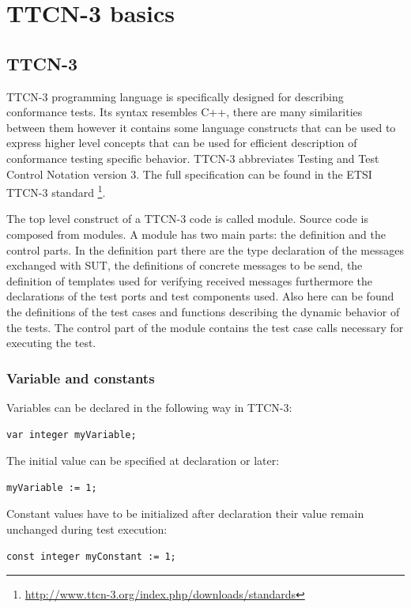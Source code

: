 \documentclass[a4paper]{article}
\begin{document}
\section{TTCN-3 basics}
\subsection{TTCN-3}
TTCN-3 programming language is specifically designed for describing conformance tests. Its syntax resembles C++, there
are many similarities between them however it contains some language constructs that can be used to express higher
level concepts that can be used for efficient description of conformance testing specific behavior. TTCN-3
abbreviates Testing and Test Control Notation version 3. The full specification can be found in the ETSI TTCN-3
standard \cite{ttcn3}
\footnote{\url{http://www.ttcn-3.org/index.php/downloads/standards}}.

The top level construct of a TTCN-3 code is called module. Source code is composed from modules. A module has two main
parts: the definition and the control parts. In the definition part there are the type declaration of the messages
exchanged
with SUT, the definitions of concrete messages to be send, the definition of templates used for verifying received
messages furthermore the declarations of the test ports and test components used. Also here can be found the
definitions of the test cases and functions describing the dynamic behavior of the tests. The control part of the
module contains the test case calls necessary for executing the test.

\subsubsection{Variable and constants}

Variables can be declared in the following way in TTCN-3:

{\footnotesize
\begin{lstlisting}
var integer myVariable;
\end{lstlisting}
}

The initial value can be specified at declaration or later:
{\footnotesize
\begin{lstlisting}
myVariable := 1;
\end{lstlisting}
}

Constant values have to be initialized after declaration their value remain unchanged during test execution:

{\footnotesize
\begin{lstlisting}
const integer myConstant := 1;
\end{lstlisting}
}
\end{document}
